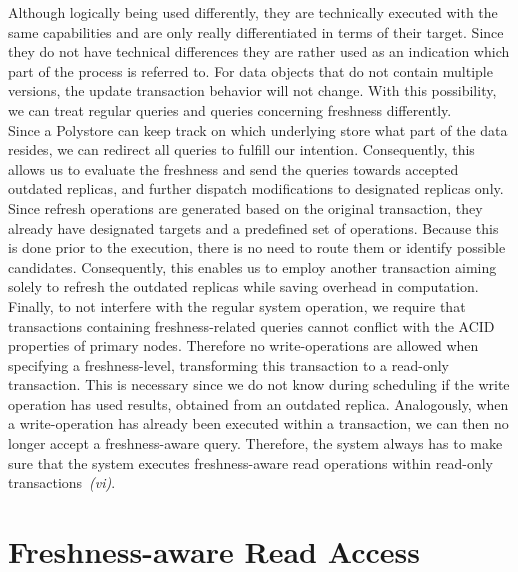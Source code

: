 Although logically being used differently, they are technically executed with the same capabilities and are only really differentiated in terms of their target.
Since they do not have technical differences they are rather used as an indication which part of the process is referred to.
For data objects that do not contain multiple versions, the update transaction behavior will not change.
With this possibility, we can treat regular queries and queries concerning freshness differently.\\
Since a Polystore can keep track on which 
underlying store what part of the data resides, we can redirect all queries to fulfill our intention. Consequently, this allows us to evaluate the freshness
and send the queries towards accepted outdated replicas, and further dispatch modifications to designated replicas only.\\
Since refresh operations are generated based on the original transaction, they already have designated targets and a predefined set of operations.
Because this is done prior to the execution, there is no need to route them or identify possible candidates.
Consequently, this enables us to employ another transaction aiming solely to refresh the outdated replicas while saving overhead in computation.\\
Finally, to not interfere with the regular system operation, we require that transactions containing freshness-related queries cannot conflict with the ACID properties 
of primary nodes. Therefore no write-operations are allowed when specifying a freshness-level, transforming this transaction to a read-only transaction.
This is necessary since we do not know during scheduling if the write operation has used results, obtained from an outdated replica.
Analogously, when a write-operation has already been executed within a transaction, we can then no longer accept a freshness-aware query. 
Therefore, the system always has to make sure that the system executes freshness-aware read operations within read-only transactions~\textit{(vi)}. 






\section{Freshness-aware Read Access}
\label{sec:read_access}


